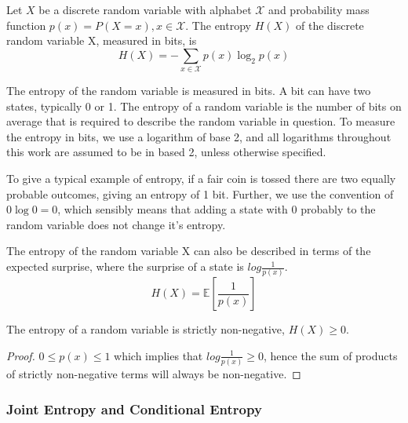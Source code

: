 \begin{definition}
	Let $X$ be a discrete random variable with alphabet $\mathcal{X}$ and probability mass function $p(x) = P(X = x), x \in \mathcal{X}$.
	The entropy $H(X)$ of the discrete random variable X, measured in bits, is 
	\begin{equation}\label{eq:shannon}
	H(X)=-\sum_{x \in \mathcal{X}} p(x) \log_2 p(x)
	\end{equation}
\end{definition} 

The entropy of the random variable is measured in bits. A bit can have two states, typically 0 or 1. The entropy of a random variable is the number of bits on average that is required to describe the random variable in question. To measure the entropy in bits, we use a logarithm of base 2, and all logarithms throughout this work are assumed to be in based 2, unless otherwise specified.

To give a typical example of entropy, if a fair coin is tossed there are two equally probable outcomes, giving an entropy of 1 bit. Further, we use the convention of $0\log 0 = 0$, which sensibly means that adding a state with 0 probably to the random variable does not change it's entropy.

\begin{remark}[Suprise]
	The entropy of the random variable X can also be described in terms of the expected surprise, where the surprise of a state is $log \frac{1}{p(x)}$.
	\begin{equation}
		H(X) = \mathbb{E} \left[ \frac{1}{p(x)} \right]
	\end{equation}
\end{remark}	





\begin{lemma}
	The entropy of a random variable is strictly non-negative, $H(X) \geq 0$.
\end{lemma}

\begin{proof}
	$0 \leq p(x) \leq 1$ which implies that $log \frac{1}{p(x)} \geq 0$,
	hence the sum of products of strictly non-negative terms will always be non-negative. 
\end{proof}


\subsubsection{Joint Entropy and Conditional Entropy}

